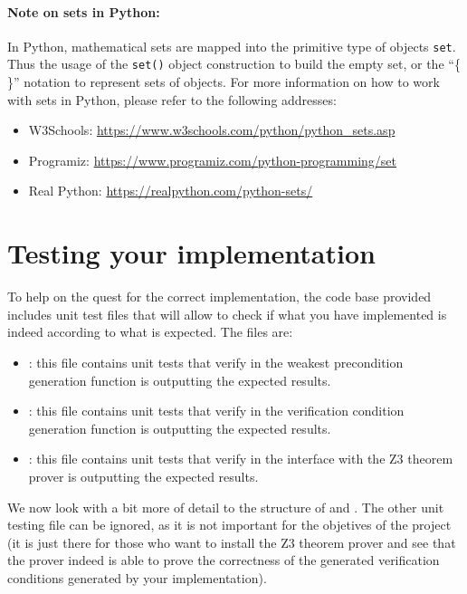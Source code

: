 \documentclass[11pt]{article}
\begin{document}
\paragraph{Note on sets in Python:} In Python, mathematical sets are mapped into the primitive type of objects \lstinline!set!. Thus the usage of the \lstinline!set()! object construction to build the empty set, or the ``\{ \}'' notation to represent sets of objects. For more information on how to work with sets in Python, please refer to the following addresses:
\begin{itemize}
  \item W3Schools: \url{https://www.w3schools.com/python/python_sets.asp}
  \item Programiz: \url{https://www.programiz.com/python-programming/set}
  \item Real Python: \url{https://realpython.com/python-sets/}
\end{itemize}

\section{Testing your implementation}

To help on the quest for the correct implementation, the code base provided includes unit test files that will allow to check if what you have implemented is indeed according to what is expected. The files are:
\begin{itemize}
  \item {}: this file contains unit tests that verify in the weakest precondition generation function is outputting the expected results.
  \item {}: this file contains unit tests that verify in the verification condition generation function is outputting the expected results.
  \item {}: this file contains unit tests that verify in the interface with the Z3 theorem prover is outputting the expected results.
\end{itemize}

We now look with a bit more of detail to the structure of  and . The other unit testing file can be ignored, as it is not important for the objetives of the project (it is just there for those who want to install the Z3 theorem prover and see that the prover indeed is able to prove the correctness of the generated verification conditions generated by your implementation).
\end{document}
